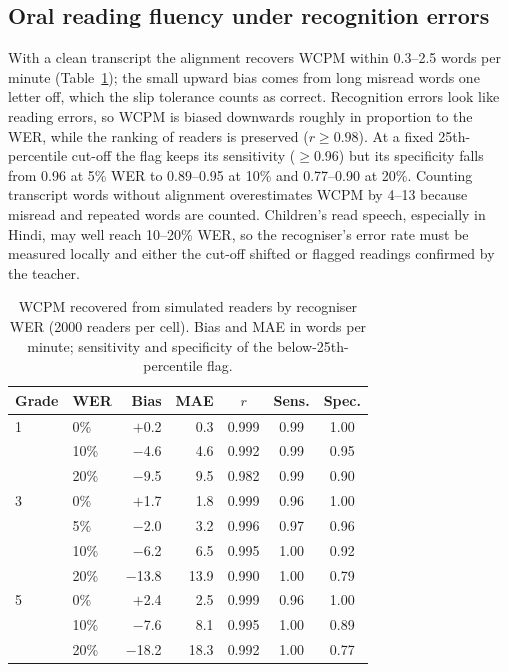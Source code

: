 \documentclass[conference]{IEEEtran}
\begin{document}
\subsection{Oral reading fluency under recognition errors}
With a clean transcript the alignment recovers WCPM within 0.3--2.5 words per minute
(Table~\ref{tab:orf}); the small upward bias comes from long misread words one letter
off, which the slip tolerance counts as correct. Recognition errors look like reading
errors, so WCPM is biased downwards roughly in proportion to the WER, while the
ranking of readers is preserved ($r\geq0.98$). At a fixed 25th-percentile cut-off the
flag keeps its sensitivity ($\geq$0.96) but its specificity falls from 0.96 at 5\% WER
to 0.89--0.95 at 10\% and 0.77--0.90 at 20\%. Counting transcript words without
alignment overestimates WCPM by 4--13 because misread and repeated words are counted.
Children's read speech, especially in Hindi, may well reach 10--20\% WER, so the
recogniser's error rate must be measured locally and either the cut-off shifted or
flagged readings confirmed by the teacher.

\begin{table}[!t]
\centering
\caption{WCPM recovered from simulated readers by recogniser WER (2000 readers per cell). Bias and MAE in words per minute; sensitivity and specificity of the below-25th-percentile flag.}
\label{tab:orf}
\footnotesize
\setlength{\tabcolsep}{3pt}
\begin{tabular}{@{}llrrccc@{}}
\toprule
Grade & WER & Bias & MAE & $r$ & Sens. & Spec. \\
\midrule
1 & 0\% & $+$0.2 & 0.3 & 0.999 & 0.99 & 1.00 \\
  & 10\% & $-$4.6 & 4.6 & 0.992 & 0.99 & 0.95 \\
  & 20\% & $-$9.5 & 9.5 & 0.982 & 0.99 & 0.90 \\
3 & 0\% & $+$1.7 & 1.8 & 0.999 & 0.96 & 1.00 \\
  & 5\% & $-$2.0 & 3.2 & 0.996 & 0.97 & 0.96 \\
  & 10\% & $-$6.2 & 6.5 & 0.995 & 1.00 & 0.92 \\
  & 20\% & $-$13.8 & 13.9 & 0.990 & 1.00 & 0.79 \\
5 & 0\% & $+$2.4 & 2.5 & 0.999 & 0.96 & 1.00 \\
  & 10\% & $-$7.6 & 8.1 & 0.995 & 1.00 & 0.89 \\
  & 20\% & $-$18.2 & 18.3 & 0.992 & 1.00 & 0.77 \\
\bottomrule
\end{tabular}
\end{table}
\end{document}
